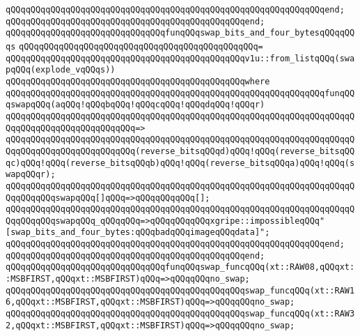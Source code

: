 \verb|qQQqqQQqqQQqqQQqqQQqqQQqqQQqqQQqqQQqqQQqqQQqqQQqqQQqqQQqqQQqqQQqend;|\newline
\verb|qQQqqQQqqQQqqQQqqQQqqQQqqQQqqQQqqQQqqQQqqQQqqQQqend;|\newline
\newline
\verb|qQQqqQQqqQQqqQQqqQQqqQQqqQQqqQQqfunqQQqswap_bits_and_four_bytesqQQqqQQqs|\newline
\verb|qQQqqQQqqQQqqQQqqQQqqQQqqQQqqQQqqQQqqQQqqQQqqQQq=|\newline
\verb|qQQqqQQqqQQqqQQqqQQqqQQqqQQqqQQqqQQqqQQqqQQqqQQqv1u::from_listqQQq(swapqQQq(explode_vqQQqs))|\newline
\verb|qQQqqQQqqQQqqQQqqQQqqQQqqQQqqQQqqQQqqQQqqQQqqQQqwhere|\newline
\verb|qQQqqQQqqQQqqQQqqQQqqQQqqQQqqQQqqQQqqQQqqQQqqQQqqQQqqQQqqQQqqQQqfunqQQqswapqQQq(aqQQq!qQQqbqQQq!qQQqcqQQq!qQQqdqQQq!qQQqr)|\newline
\verb|qQQqqQQqqQQqqQQqqQQqqQQqqQQqqQQqqQQqqQQqqQQqqQQqqQQqqQQqqQQqqQQqqQQqqQQqqQQqqQQqqQQqqQQqqQQqqQQq=>|\newline
\verb|qQQqqQQqqQQqqQQqqQQqqQQqqQQqqQQqqQQqqQQqqQQqqQQqqQQqqQQqqQQqqQQqqQQqqQQqqQQqqQQqqQQqqQQqqQQqqQQq(reverse_bitsqQQqd)qQQq!qQQq(reverse_bitsqQQqc)qQQq!qQQq(reverse_bitsqQQqb)qQQq!qQQq(reverse_bitsqQQqa)qQQq!qQQq(swapqQQqr);|\newline
\newline
\verb|qQQqqQQqqQQqqQQqqQQqqQQqqQQqqQQqqQQqqQQqqQQqqQQqqQQqqQQqqQQqqQQqqQQqqQQqqQQqqQQqswapqQQq[]qQQq=>qQQqqQQqqQQq[];|\newline
\verb|qQQqqQQqqQQqqQQqqQQqqQQqqQQqqQQqqQQqqQQqqQQqqQQqqQQqqQQqqQQqqQQqqQQqqQQqqQQqqQQqswapqQQq_qQQqqQQq=>qQQqqQQqqQQqxgripe::impossibleqQQq"[swap_bits_and_four_bytes:qQQqbadqQQqimageqQQqdata]";|\newline
\verb|qQQqqQQqqQQqqQQqqQQqqQQqqQQqqQQqqQQqqQQqqQQqqQQqqQQqqQQqqQQqqQQqend;|\newline
\verb|qQQqqQQqqQQqqQQqqQQqqQQqqQQqqQQqqQQqqQQqqQQqqQQqend;|\newline
\newline
\verb|qQQqqQQqqQQqqQQqqQQqqQQqqQQqqQQqfunqQQqswap_funcqQQq(xt::RAW08,qQQqxt::MSBFIRST,qQQqxt::MSBFIRST)qQQq=>qQQqqQQqno_swap;|\newline
\verb|qQQqqQQqqQQqqQQqqQQqqQQqqQQqqQQqqQQqqQQqqQQqqQQqswap_funcqQQq(xt::RAW16,qQQqxt::MSBFIRST,qQQqxt::MSBFIRST)qQQq=>qQQqqQQqno_swap;|\newline
\verb|qQQqqQQqqQQqqQQqqQQqqQQqqQQqqQQqqQQqqQQqqQQqqQQqswap_funcqQQq(xt::RAW32,qQQqxt::MSBFIRST,qQQqxt::MSBFIRST)qQQq=>qQQqqQQqno_swap;|\newline

